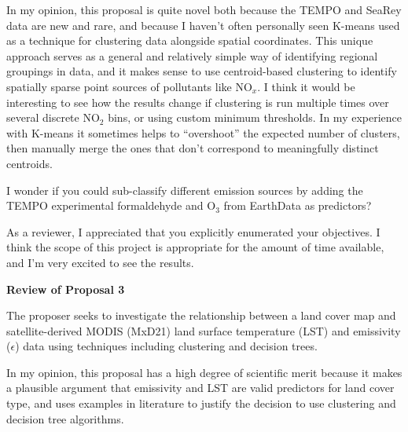 \documentclass[12pt]{article}
\begin{document}
In my opinion, this proposal is quite novel both because the TEMPO and SeaRey data are new and rare, and because I haven't often personally seen K-means used as a technique for clustering data alongside spatial coordinates. This unique approach serves as a general and relatively simple way of identifying regional groupings in data, and it makes sense to use centroid-based clustering to identify spatially sparse point sources of pollutants like NO$_x$. I think it would be interesting to see how the results change if clustering is run multiple times over several discrete NO$_2$ bins, or using custom minimum thresholds. In my experience with K-means it sometimes helps to ``overshoot'' the expected number of clusters, then manually merge the ones that don't correspond to meaningfully distinct centroids.

I wonder if you could sub-classify different emission sources by adding the TEMPO experimental formaldehyde and O$_3$ from EarthData as predictors?


As a reviewer, I appreciated that you explicitly enumerated your objectives. I think the scope of this project is appropriate for the amount of time available, and I'm very excited to see the results.

\newpage

\noindent
{\large\textbf{Review of Proposal 3}}


The proposer seeks to investigate the relationship between a land cover map and satellite-derived MODIS (MxD21) land surface temperature (LST) and emissivity ($\epsilon$) data using techniques including clustering and decision trees.

In my opinion, this proposal has a high degree of scientific merit because it makes a plausible argument that emissivity and LST are valid predictors for land cover type, and uses examples in literature to justify the decision to use clustering and decision tree algorithms.
\end{document}
